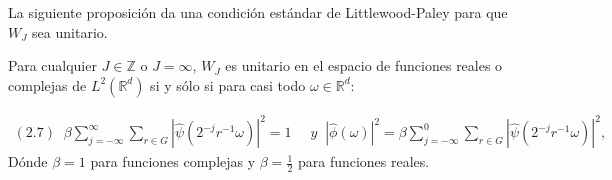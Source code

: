 \medskip

\noindent La siguiente proposición da una condición estándar de Littlewood-Paley para que $W_J$ sea unitario.

\begin{proposicion} \label{unitario}
 Para cualquier $J \in \mathbb{Z}$ o $J=\infty$, $W_J$ es unitario en el espacio de funciones reales o complejas de $L^2(\mathbb{R}^d)$ si y sólo si para casi todo $\omega \in \mathbb{R}^d$: 
 
     \begin{align*}
        (2.7) \; \; \beta \sum_{j=-\infty}^\infty \sum_{r \in G} |\widehat{\psi}(2^{-j}r^{-1}\omega)|^2=1 & \; \; y
        \;\;|\widehat{\phi}(\omega)|^2= \beta \sum_{j=-\infty}^0 \sum_{r\in G} |\widehat{\psi}(2^{-j}r^{-1}\omega)|^2,
    \end{align*}
 Dónde $\beta=1$ para funciones complejas y $\beta=\frac{1}{2}$ para funciones reales.
\end{proposicion}

